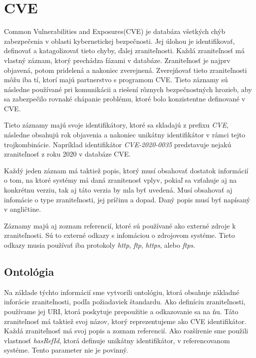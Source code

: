 \documentclass[12pt, a4paper, oneside]{book}
\begin{document}
\section{CVE}
Common Vulnerabilities and Exposures(CVE) je databáza všetkých chýb zabezpečenia v oblasti kybernetickej bezpečnosti. Jej úlohou je identifikovať, definovať a katagolizovať tieto chyby, ďalej zraniteľnosti. Každá zraniteľnosť má vlastný záznam, ktorý prechádza fázami v databáze. Zraniteľnosť je najprv objavená, potom pridelená a nakoniec zverejnená. Zverejňovať tieto zraniteľnosti môžu iba tí, ktorí majú partnerstvo s programom CVE. Tieto záznamy sú následne používané pri komunikácii a riešení rôznych bezpečnostných hrozieb, aby sa zabezpečilo rovnaké chápanie problému, ktoré bolo konzistentne definované v CVE.  


Tieto záznamy majú svoje identifikátory, ktoré sa skladajú z prefixu \textit{CVE}, následne obsahujú rok objavenia a nakoniec unikátny identifikátor v rámci tejto trojkombinácie. Napríklad identifikátor \textit{CVE-2020-0035} predstavuje nejakú zraniteľnosť z roku 2020 v databáze CVE.


Každý jeden záznam má taktiež popis, ktorý musí obsahovať dostatok informácií o tom, na ktoré systémy má daná zranitenosť vplyv, pokiaľ sa vzťahuje aj na konkrétnu verziu, tak aj táto verzia by mla byť uvedená. Musí obsahovať aj infomácie o type zraniteľnosti, jej príčinu a dopad. Daný popis musí byť napísaný v angličtine.


Záznamy majú aj zoznam referencií, ktoré sú používané ako externé zdroje k zraniteľnosti. Sú to externé odkazy s infomáciou o zdrojovom systéme. Tieto odkazy musia používať iba protokoly \textit{http}, \textit{ftp}, \textit{https}, alebo \textit{ftps}.


\subsection{Ontológia}
Na základe týchto informácií sme vytvorili ontológiu, ktorá obsahuje základné inforácie zraniteľnosti, podľa požiadaviek štandardu. Ako definíciu zraniteľnosti, používame jej URI, ktorá poskytuje prepoužitie a odkazovanie sa na ňu. Táto zraniteľnosť má taktiež svoj názov, ktorý reprezentujeme ako CVE identifikátor. Každá zraniteľnosť má svoj popis a zoznam referencií. Ako rozšírenie sme použili vlastnosť \textit{hasRefId}, ktorá definuje unikátny identifikátor, v referencovanom systéme. Tento parameter nie je povinný.
\end{document}
